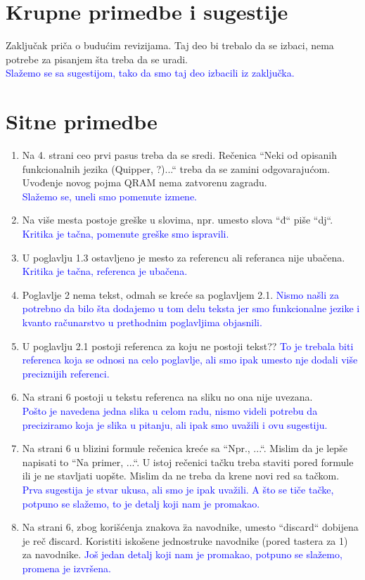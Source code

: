\documentclass[a4paper]{report}
\newcommand{\odgovor}[1]{\textcolor{blue}{#1}}
\begin{document}
\section{Krupne primedbe i sugestije}
Zaključak priča o budućim revizijama. Taj deo bi trebalo da se izbaci, nema potrebe za pisanjem šta treba da se uradi. \\
\odgovor {Slažemo se sa sugestijom, tako da smo taj deo izbacili iz zaključka.}

\section{Sitne primedbe}
\begin{enumerate}
\item Na 4. strani ceo prvi pasus treba da se sredi.
Rečenica ``Neki od opisanih funkcionalnih jezika (Quipper, ?)...`` treba da se zamini odgovarajućom.
Uvođenje novog pojma QRAM nema zatvorenu zagradu.\\
\odgovor {Slažemo se, uneli smo pomenute izmene.}

\item Na više mesta postoje greške u slovima, npr. umesto slova ``đ`` piše ``dj``.
\odgovor {Kritika je tačna, pomenute greške smo ispravili.}
\item U poglavlju 1.3 ostavljeno je mesto za referencu ali referanca nije ubačena.
\odgovor {Kritika je tačna, referenca je ubačena.}
\item Poglavlje 2 nema tekst, odmah se kreće sa poglavljem 2.1.
\odgovor {Nismo našli za potrebno da bilo šta dodajemo u tom delu teksta jer smo funkcionalne jezike i kvanto računarstvo u prethodnim poglavljima objasnili.}
\item U poglavlju 2.1 postoji referenca za koju ne postoji tekst??
\odgovor {To je trebala biti referenca koja se odnosi na celo poglavlje, ali smo ipak umesto nje dodali više preciznijih referenci.}
\item Na strani 6 postoji u tekstu referenca na sliku no ona nije uvezana.\\
\odgovor {Pošto je navedena jedna slika u celom radu, nismo videli potrebu da preciziramo koja je slika u pitanju, ali ipak smo uvažili i ovu sugestiju.}
\item Na strani 6 u blizini formule rečenica kreće sa ``Npr., ...``. Mislim da je lepše napisati to ``Na primer, ...``. U istoj rečenici tačku treba staviti pored formule ili je ne stavljati uopšte. Mislim da ne treba da krene novi red sa tačkom.
\odgovor {Prva sugestija je stvar ukusa, ali smo je ipak uvažili. A što se tiče tačke, potpuno se slažemo, to je detalj koji nam je promakao.}
\item Na strani 6, zbog korišćenja znakova \" za navodnike, umesto ``discard`` dobijena je reč điscard. Koristiti iskošene jednostruke navodnike (pored tastera za 1) za navodnike.
\odgovor {Još jedan detalj koji nam je promakao, potpuno se slažemo, promena je izvršena.}
\end{enumerate}
\end{document}
